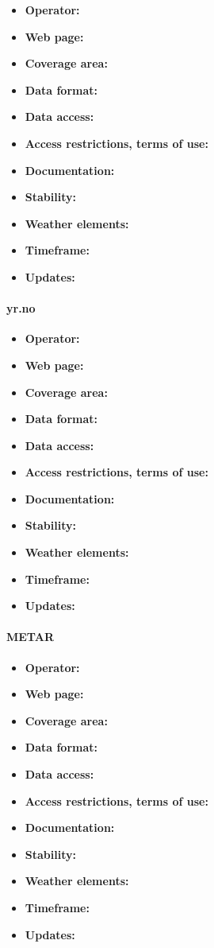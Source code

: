 \begin{itemize}
  \item \textbf{Operator:}
  \item \textbf{Web page:}
  \item \textbf{Coverage area:}
  \item \textbf{Data format:}
  \item \textbf{Data access:}
  \item \textbf{Access restrictions, terms of use:}
  \item \textbf{Documentation:}
  \item \textbf{Stability:}
  \item \textbf{Weather elements:}
  \item \textbf{Timeframe:}
  \item \textbf{Updates:}
\end{itemize}

\paragraph{yr.no}

\begin{itemize}
  \item \textbf{Operator:}
  \item \textbf{Web page:}
  \item \textbf{Coverage area:}
  \item \textbf{Data format:}
  \item \textbf{Data access:}
  \item \textbf{Access restrictions, terms of use:}
  \item \textbf{Documentation:}
  \item \textbf{Stability:}
  \item \textbf{Weather elements:}
  \item \textbf{Timeframe:}
  \item \textbf{Updates:}
\end{itemize}

\paragraph{METAR}

\begin{itemize}
  \item \textbf{Operator:}
  \item \textbf{Web page:}
  \item \textbf{Coverage area:}
  \item \textbf{Data format:}
  \item \textbf{Data access:}
  \item \textbf{Access restrictions, terms of use:}
  \item \textbf{Documentation:}
  \item \textbf{Stability:}
  \item \textbf{Weather elements:}
  \item \textbf{Timeframe:}
  \item \textbf{Updates:}
\end{itemize}

